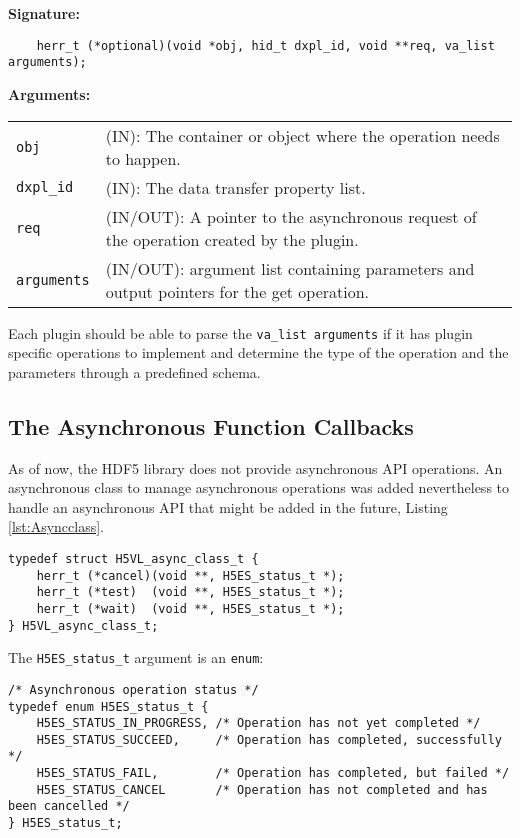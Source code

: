 \begin{mdframed}[style=bgbox]
\textbf{Signature:}
\begin{lstlisting}
    herr_t (*optional)(void *obj, hid_t dxpl_id, void **req, va_list arguments);
\end{lstlisting}

\textbf{Arguments:}\\
\begin{tabular}{l p{10cm}}
  \texttt{obj} & (IN): The container or object where the operation needs to happen.\\
  \texttt{dxpl\_id} & (IN): The data transfer property list.\\
  \texttt{req} & (IN/OUT): A pointer to the asynchronous request of the operation created by the plugin.\\
  \texttt{arguments} & (IN/OUT): argument list containing parameters and output pointers for the get operation. \\
\end{tabular}
\end{mdframed}

Each plugin should be able to parse the \texttt{va\_list arguments} if it has plugin specific operations to implement and determine the type of the operation and the parameters through a predefined schema. 

\subsection{The Asynchronous Function Callbacks}
As of now, the HDF5 library does not provide asynchronous API
operations. An asynchronous class to manage asynchronous operations
was added nevertheless to handle an asynchronous API that might be
added in the future, Listing \ref{lst:Asyncclass}.

\begin{lstlisting}[caption={Structure for async callback routines, H5VLpublic.h}, captionpos=b, label={lst:Asyncclass}]
typedef struct H5VL_async_class_t {
    herr_t (*cancel)(void **, H5ES_status_t *);
    herr_t (*test)  (void **, H5ES_status_t *);
    herr_t (*wait)  (void **, H5ES_status_t *);
} H5VL_async_class_t;
\end{lstlisting}

The \texttt{H5ES\_status\_t} argument is an \texttt{enum}:
\begin{lstlisting}
/* Asynchronous operation status */
typedef enum H5ES_status_t {
    H5ES_STATUS_IN_PROGRESS, /* Operation has not yet completed */
    H5ES_STATUS_SUCCEED,     /* Operation has completed, successfully */
    H5ES_STATUS_FAIL,        /* Operation has completed, but failed */
    H5ES_STATUS_CANCEL       /* Operation has not completed and has been cancelled */
} H5ES_status_t;
\end{lstlisting}

